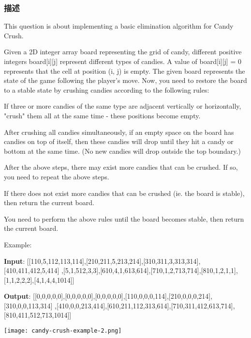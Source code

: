 \subsubsection{描述}
This question is about implementing a basic elimination algorithm for Candy Crush.

Given a 2D integer array board representing the grid of candy, different positive integers board[i][j] represent different types of candies. A value of board[i][j] = 0 represents that the cell at position (i, j) is empty. The given board represents the state of the game following the player's move. Now, you need to restore the board to a stable state by crushing candies according to the following rules:

\begindot
\item If three or more candies of the same type are adjacent vertically or horizontally, "crush" them all at the same time - these positions become empty.
\item After crushing all candies simultaneously, if an empty space on the board has candies on top of itself, then these candies will drop until they hit a candy or bottom at the same time. (No new candies will drop outside the top boundary.)
\item After the above steps, there may exist more candies that can be crushed. If so, you need to repeat the above steps.
\item If there does not exist more candies that can be crushed (ie. the board is stable), then return the current board.
\myenddot

You need to perform the above rules until the board becomes stable, then return the current board.


Example:

\textbf{Input}:
       [[110,5,112,113,114],[210,211,5,213,214],[310,311,3,313,314],[410,411,412,5,414]
         ,[5,1,512,3,3],[610,4,1,613,614],[710,1,2,713,714],[810,1,2,1,1],[1,1,2,2,2],[4,1,4,4,1014]]

\textbf{Output}:
       [[0,0,0,0,0],[0,0,0,0,0],[0,0,0,0,0],[110,0,0,0,114],[210,0,0,0,214],[310,0,0,113,314]
         ,[410,0,0,213,414],[610,211,112,313,614],[710,311,412,613,714],[810,411,512,713,1014]]



\begin{center}
\texttt{[image: candy-crush-example-2.png]}\\
\label{fig:candy-crush-example}
\end{center}

